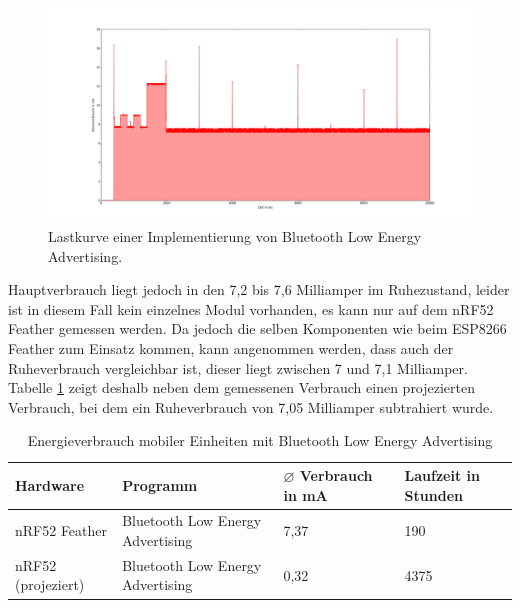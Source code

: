 \begin{figure}[h!]
  \centering
	\includegraphics[width=\textwidth]{plots/blue.png}
  \caption{Lastkurve einer Implementierung von Bluetooth Low Energy Advertising.}
  \label{fig:blue}
\end{figure}

Hauptverbrauch liegt jedoch in den 7,2 bis 7,6 Milliamper im Ruhezustand, leider ist in diesem Fall kein einzelnes Modul vorhanden, es kann nur auf dem nRF52 Feather gemessen werden.
Da jedoch die selben Komponenten wie beim ESP8266 Feather zum Einsatz kommen, kann angenommen werden, dass auch der Ruheverbrauch vergleichbar ist, dieser liegt zwischen 7 und 7,1 Milliamper.
Tabelle \ref{table:blueina} zeigt deshalb neben dem gemessenen Verbrauch einen projezierten Verbrauch, bei dem ein Ruheverbrauch von 7,05 Milliamper subtrahiert wurde.

\begin{table}[h!]
	\centering
	\caption{Energieverbrauch mobiler Einheiten mit Bluetooth Low Energy Advertising}
	\label{table:blueina}
	\begin{tabular}{p{3.5cm}|p{5cm}|p{2.5cm}|p{2.5cm}}
		Hardware & Programm & $\varnothing$ Verbrauch in mA & Laufzeit in Stunden\\
		\hline
		nRF52 Feather & Bluetooth Low Energy Advertising & 7,37 & 190\\
		nRF52 (projeziert) & Bluetooth Low Energy Advertising & 0,32 & 4375\\
	\end{tabular}
\end{table}






